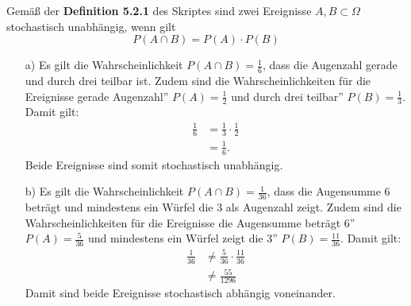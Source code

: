 Gemäß der \textbf{Definition 5.2.1} des Skriptes sind zwei Ereignisse $A, B \subset \Omega$ stochastisch unabhängig, wenn gilt
\begin{equation*}
	P(A \cap B) = P(A) \cdot P(B)
\end{equation*}
\begin{enumerate}
	\item[a)] Es gilt die Wahrscheinlichkeit $P(A \cap B) = \frac{1}{6}$, dass die Augenzahl gerade und durch drei teilbar ist. Zudem sind die Wahrscheinlichkeiten für die Ereignisse \glqq gerade Augenzahl'' $P(A)  = \frac{1}{2}$ und \glqq durch drei teilbar'' $P(B) = \frac{1}{3}$. Damit gilt:
	\begin{equation*}
		\begin{split}
			\frac{1}{6} &= \frac{1}{3} \cdot \frac{1}{2}\\
						&= \frac{1}{6}.
		\end{split}
	\end{equation*}
	Beide Ereignisse sind somit stochastisch unabhängig.
	\item[b)] Es gilt die Wahrscheinlichkeit $P(A \cap B) = \frac{1}{36}$, dass die Augensumme 6 beträgt und mindestens ein Würfel die 3 als Augenzahl zeigt. Zudem sind die Wahrscheinlichkeiten für die Ereignisse \glqq die Augensumme beträgt 6'' $P(A) = \frac{5}{36}$ und \glqq mindestens ein Würfel zeigt die 3'' $P(B) = \frac{11}{36}$. Damit gilt:
	\begin{equation*}
		\begin{split}
			\frac{1}{36} &\neq \frac{5}{36} \cdot \frac{11}{36}\\
						 &\neq \frac{55}{1296}
		\end{split}
	\end{equation*}
	Damit sind beide Ereignisse stochastisch abhängig voneinander.
\end{enumerate}